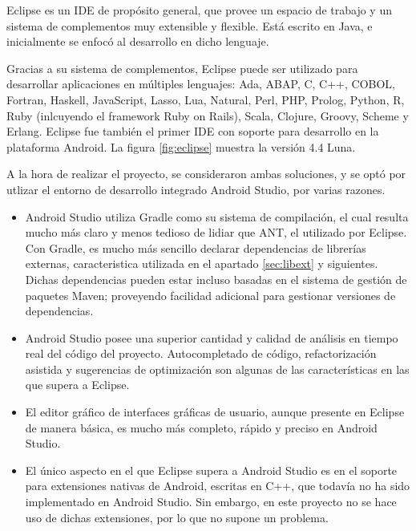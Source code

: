     Eclipse es un \ac{IDE} de propósito general, que provee un espacio de trabajo y un sistema de complementos muy extensible y flexible. Está escrito en Java, e inicialmente se enfocó al desarrollo en dicho lenguaje. 
    
    Gracias a su sistema de complementos, Eclipse puede ser utilizado para desarrollar aplicaciones en múltiples lenguajes: Ada, ABAP, C, C++, COBOL, Fortran, Haskell, JavaScript, Lasso, Lua, Natural, Perl, PHP, Prolog, Python, R, Ruby (inlcuyendo el framework Ruby on Rails), Scala, Clojure, Groovy, Scheme y Erlang. Eclipse fue también el primer \ac{IDE} con soporte para desarrollo en la plataforma Android. La figura \ref{fig:eclipse} muestra la versión 4.4 Luna.

    A la hora de realizar el proyecto, se consideraron ambas soluciones, y se optó por utlizar el entorno de desarrollo integrado Android Studio, por varias razones.
\begin{itemize}
\item Android Studio utiliza Gradle como su sistema de compilación, el cual resulta mucho más claro y menos tedioso de lidiar que ANT, el utilizado por Eclipse. Con Gradle, es mucho más sencillo declarar dependencias de librerías externas, caracteristica utilizada en el apartado \ref{sec:libext} y siguientes. Dichas dependencias pueden estar incluso basadas en el sistema de gestión de paquetes Maven; proveyendo facilidad adicional para gestionar versiones de dependencias.

\item Android Studio posee una superior cantidad y calidad de análisis en tiempo real del código del proyecto. Autocompletado de código, refactorización asistida y sugerencias de optimización son algunas de las características en las que supera a Eclipse.

\item El editor gráfico de interfaces gráficas de usuario, aunque presente en Eclipse de manera básica, es mucho más completo, rápido y preciso en Android Studio.

\item El único aspecto en el que Eclipse supera a Android Studio es en el soporte para extensiones nativas de Android, escritas en C++, que todavía no ha sido implementado en Android Studio. Sin embargo, en este proyecto no se hace uso de dichas extensiones, por lo que no supone un problema.

\end{itemize}

